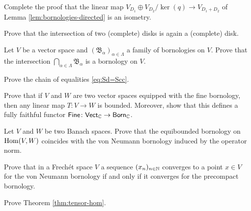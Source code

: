 
\bigskip
\exs %
\bigskip
\begin{exercise} \label{ex:disk-sum-iso}
Complete the proof that 
the linear map $V_{D_1} \oplus V_{D_2} / \ker(q)
\to V_{D_1+D_2}$ of Lemma \ref{lem:bornologies-directed} is an isometry.
\end{exercise}

\begin{exercise} \label{ex:disk-int}
Prove that the intersection of two (complete) disks 
is again a (complete) disk.
\end{exercise}

\begin{exercise}\label{ex:int-bor}
Let $V$ be a vector space and $(\mathfrak{B}_\alpha)_{\alpha \in \Lambda}$ a
family of bornologies on $V$. 
Prove that the intersection $\bigcap_{\alpha \in \Lambda} \mathfrak B_\alpha$
is a bornology on $V$.
\end{exercise}

\begin{exercise} \label{ex:circ-conv=disk}
Prove the chain of equalities \eqref{eq:Sd=Scc}.
\end{exercise}

\begin{exercise} \label{ex:fine}
Prove that if $V$ and $W$ are 
two vector spaces equipped with
the fine bornology, then 
any linear map $T \colon V \to W$
is bounded. Moreover, show that this defines a fully faithful functor $\mathsf{Fine} \colon \mathsf{Vect}_{\mathbb C} \to \mathsf{Born}_\mathbb C$.
\end{exercise}

\begin{exercise} \label{ex:equib-op}
Let $V$ and $W$ be two Banach spaces.
Prove that the equibounded bornology
on $\operatorname{Hom}(V,W)$ coincides with 
the von Neumann bornology induced
by the operator norm.
\end{exercise}

\begin{exercise} \label{ex:conv-Cpt=vN}
Prove that in a Frechét space $V$
a sequence $(x_n)_{n \in \mathbb N}$
converges to a point $x \in V$
for the von Neumann bornology 
if and only if it converges for
the precompact bornology.
\end{exercise}

\begin{exercise} \label{ex:tensor-hom}
Prove Theorem \ref{thm:tensor-hom}.
\end{exercise}
\bigskip